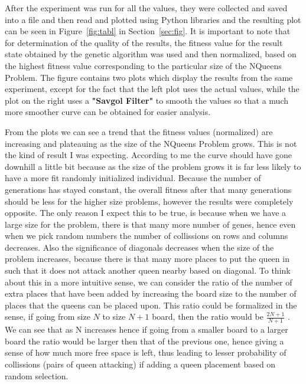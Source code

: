 \documentclass[11pt]{article}
\begin{document}
After the experiment was run for all the values, they were collected and saved into a file and then read and plotted using Python libraries and the resulting plot can be seen in Figure~\ref{fig:tabl} in Section~\ref{sec:fig}. It is important to note that for determination of the quality of the results, the fitness value for the result state obtained by the genetic algorithm was used and then normalized, based on the highest fitness value corresponding to the particular size of the NQueens Problem. The figure contains two plots which display the results from the same experiment, except for the fact that the left plot uses the actual values, while the plot on the right uses a \textbf{"Savgol Filter"} to smooth the values so that a much more smoother curve can be obtained for easier analysis.

From the plots we can see a trend that the fitness values (normalized) are increasing and plateauing as the size of the NQueens Problem grows. This is not the kind of result I was expecting. According to me the curve should have gone downhill a little bit because as the size of the problem grows it is far less likely to have a more fit randomly initialized individual. Because the number of generations has stayed constant, the overall fitness after that many generations should be less for the higher size problems, however the results were completely opposite. The only reason I expect this to be true, is because when we have a large size for the problem, there is that many more number of genes, hence even when we pick random numbers the number of collissions on rows and columns decreases. Also the significance of diagonals decreases when the size of the problem increases, because there is that many more places to put the queen in such that it does not attack another queen nearby based on diagonal. To think about this in a more intuitive sense, we can consider the ratio of the number of extra places that have been added by increasing the board size to the number of places that the queens can be placed upon. This ratio could be formalized in the sense, if going from size $N$ to size $N+1$ board, then the ratio would be $\frac{2N+1}{N + 1}$ . We can see that as N increases hence if going from a smaller board to a larger board the ratio would be larger then that of the previous one, hence giving a sense of how much more free space is left, thus leading to lesser probability of collissions (pairs of queen attacking) if adding a queen placement based on random selection.
\end{document}

